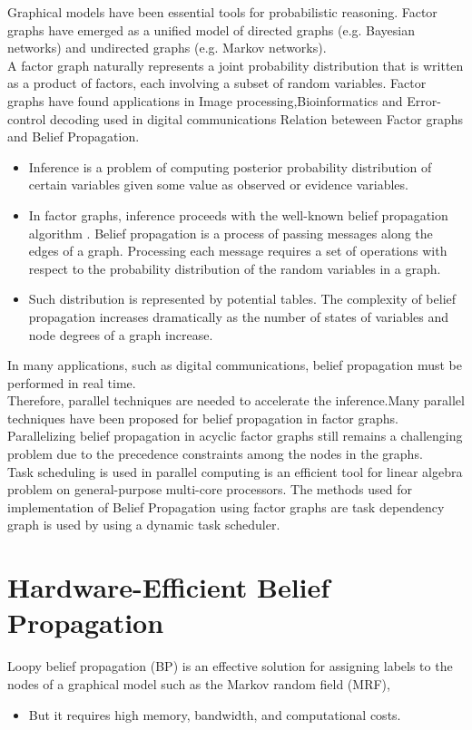 Graphical models have been essential tools for probabilistic reasoning. Factor graphs  have emerged as a unified model of directed graphs (e.g. Bayesian networks) and undirected graphs (e.g. Markov networks).\\ A factor graph naturally represents a joint probability distribution that is written as a product of factors, each involving a subset of random variables.
Factor graphs have found applications in   Image processing,Bioinformatics and  Error-control decoding used in digital communications
Relation beteween  Factor graphs and Belief Propagation.
\begin{itemize}
  \item Inference is a problem of computing posterior probability distribution of certain variables given some value as observed or evidence variables.
  \item In factor graphs, inference proceeds with the well-known belief propagation algorithm . Belief propagation is a process of passing messages along the edges of a graph. Processing each message requires a set of operations with respect to the probability distribution of the random variables in a graph.
  \item Such distribution is represented by potential tables. The complexity of belief propagation increases dramatically as the number of states of variables and node degrees of a graph increase.
\end{itemize}

In many applications, such as digital communications, belief propagation must be performed in real time.\\ Therefore, parallel techniques are needed to accelerate the inference.Many parallel techniques have been proposed for belief propagation in factor graphs.\\ Parallelizing belief propagation in acyclic factor graphs still remains a challenging problem due to the precedence constraints among the nodes in the graphs. \\ Task scheduling is used in parallel computing is an efficient tool  for linear algebra problem on general-purpose multi-core processors.
The  methods used for  implementation of Belief Propagation using factor graphs are task dependency graph is used  by using a dynamic task scheduler.


\section{ Hardware-Efficient Belief Propagation}
Loopy belief  propagation (BP)  is  an  effective solution for  assigning labels to  the  nodes of  a  graphical model such as the Markov random field (MRF),
\begin{itemize}
  \item But it requires high memory, bandwidth, and computational costs.
\end{itemize}

